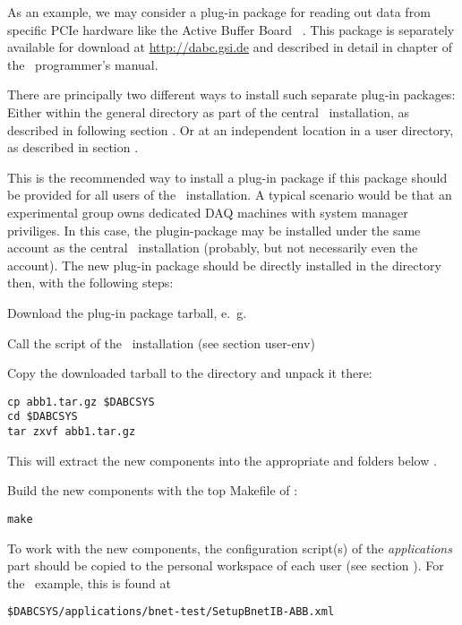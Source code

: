As an example, we may consider a plug-in package for reading out data
from specific PCIe hardware like the Active Buffer Board \ABB\ \cite{AbbDescription}.
This package is separately available for download at \hyperref{http://dabc.gsi.de}{}{}{http://dabc.gsi.de}
and described in detail in chapter  of the \dabc\ programmer's manual.

There are principally two different ways to install such separate plug-in packages:
Either within the general  directory as part of the central \dabc\ installation, as
described in following section . Or at an independent location
in a user directory, as described in section .


This is the recommended way to install a plug-in package if this package should be provided
for all users of the \dabc\ installation. A typical scenario would be that an
experimental group owns dedicated DAQ machines with system manager priviliges.
In this case, the plugin-package may be installed under the same account as the
central \dabc\ installation (probably, but not necessarily even the  account).
The new plug-in package should be directly installed in the  directory
then, with the following steps:

\bnum
\item Download the plug-in package tarball, e.~g.\ 

\item Call the  script of the \dabc\ installation (see section user-env)

\item Copy the downloaded tarball to the  directory and unpack it there:
\begin{verbatim}
cp abb1.tar.gz $DABCSYS
cd $DABCSYS
tar zxvf abb1.tar.gz
\end{verbatim} 
This will extract the new components into the appropriate  and
 folders below .

\item Build the new components with the top Makefile of :
\begin{verbatim}
make
\end{verbatim} 

\item To work with the new components, the configuration script(s) of the {\em applications} part should be copied
to the personal workspace of each user (see section ).
For the \ABB\ example, this is found at
\begin{verbatim}
$DABCSYS/applications/bnet-test/SetupBnetIB-ABB.xml
\end{verbatim} 
\enum





